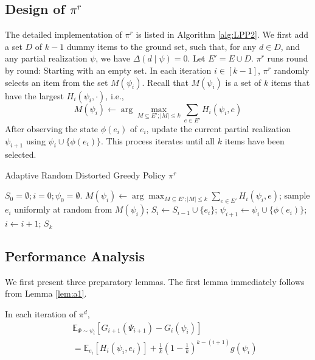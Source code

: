 \documentclass[twoside,leqno,twocolumn]{article}
\begin{document}
\subsection{Design of $\pi^r$} The detailed implementation of $\pi^r$ is listed in Algorithm \ref{alg:LPP2}. We first add a set $D$ of $k-1$ dummy items to the ground set, such that, for any $d \in D$, and any partial realization $\psi$, we have $\Delta(d \mid \psi) =0$. Let $E'=E\cup D$. $\pi^r$ runs round by round: Starting with an empty set. In each iteration $i\in[k-1]$, $\pi^{r}$  randomly selects an item from the set $M(\psi_i)$. Recall that $M(\psi_i)$ is a set of $k$ items that have the largest $H_i(\psi_i, \cdot)$, i.e.,
 \[M(\psi_i)\leftarrow \arg\max_{M\subseteq E'; |M|\leq k} \sum_{e\in E'}H_i(\psi_i, e)\]
After observing the state $\phi(e_i)$ of $e_i$, update  the current partial realization $\psi_{i+1}$ using  $\psi_{i}\cup\{\phi(e_i)\}$.  This process iterates until all  $k$ items have been selected.
\begin{algorithm}[hptb]
\caption{ Adaptive Random Distorted Greedy Policy $\pi^r$}
\label{alg:LPP2}
\begin{algorithmic}[1]
\STATE $S_0=\emptyset; i=0; \psi_0=\emptyset$.
\STATE $M(\psi_i)\leftarrow \arg\max_{M\subseteq E'; |M|\leq k} \sum_{e\in E'}H_i(\psi_i, e)$;
\STATE sample $e_i$ uniformly at random from $M(\psi_i)$;
\STATE $S_i\leftarrow S_{i-1}\cup \{e_i\}$;
\STATE $\psi_{i+1}\leftarrow \psi_{i}\cup\{\phi(e_i)\}$;  $i\leftarrow i+1$;
\ENDWHILE
\RETURN $S_k$
\end{algorithmic}
\end{algorithm}


\subsection{Performance Analysis}
We first present three preparatory lemmas. The first lemma immediately follows from Lemma \ref{lem:a1}.
\begin{lemma}
\label{lem:c1}
In each iteration of $\pi^d$,
\begin{eqnarray*}
&&\mathbb{E}_{\Phi\sim \psi_i}[G_{i+1}(\Psi_{i+1})- G_{i}(\psi_i)] \\
&&= \mathbb{E}_{e_i}[H_i(\psi_i, e_i)]+\frac{1}{k}(1-\frac{1}{k})^{k-(i+1)} g(\psi_i)
\end{eqnarray*}
\end{lemma}
\end{document}
